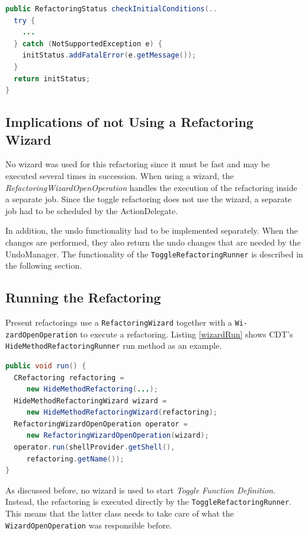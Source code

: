 \begin{lstlisting}[caption={\texttt{checkInitialConditions} forwarding an excep\-tion},
label={catchNotSupp}, language=Java]
public RefactoringStatus checkInitialConditions(..
  try {
    ...
  } catch (NotSupportedException e) {
    initStatus.addFatalError(e.getMessage());
  }
  return initStatus;
}
\end{lstlisting}


\subsection{Implications of not Using a Refactoring Wizard}
No wizard was used for this refactoring since it must be fast and may be 
executed several times in succession. When using a wizard, the 
\textit{RefactoringWizardOpenOperation} handles the execution of the refactoring 
inside a separate job. Since the toggle refactoring does not use the wizard, a 
separate job had to be scheduled by the ActionDelegate.

In addition, the undo functionality had to be implemented separately. When the 
changes are performed, they also return the undo changes that are needed by the
UndoManager. The functionality of the \texttt{ToggleRefactoringRunner} is
described in the following section.

\subsection{Running the Refactoring}\label{runnersec}
Present refactorings use a \texttt{RefactoringWizard} together with a 
\texttt{Wi- zardOpenOperation} to execute a refactoring. Listing \ref{wizardRun} 
shows CDT's \texttt{HideMethodRefactoringRunner} run method as an example.

\begin{lstlisting}[caption={Shorted run method of HideMethodRefactoringRunner},label={wizardRun}, language=Java]
public void run() {
  CRefactoring refactoring = 
     new HideMethodRefactoring(...);
  HideMethodRefactoringWizard wizard = 
     new HideMethodRefactoringWizard(refactoring);
  RefactoringWizardOpenOperation operator = 
     new RefactoringWizardOpenOperation(wizard);
  operator.run(shellProvider.getShell(), 
     refactoring.getName());
}
\end{lstlisting}

As discussed before, no wizard is used to start \textit{Toggle Function 
Definition}. Instead, the refactoring is executed directly by the 
\texttt{ToggleRefactoringRunner}. This means that the latter class needs to take 
care of what the \texttt{WizardOpenOperation} was responsible before.

